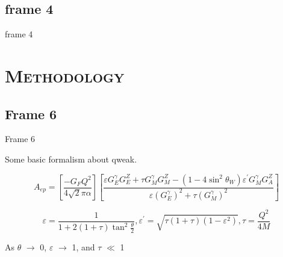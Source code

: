 \documentclass[xcolor=x11names,compress,8pt]{beamer}
\renewcommand{\(}{\begin{columns}}
\renewcommand{\)}{\end{columns}}
\newcommand{\<}[1]{\begin{column}{#1}}
\renewcommand{\>}{\end{column}}
\begin{document}
\subsection{frame 4}
\begin{frame}{frame 4}

\hspace{-0.17em}
\hspace{-0.34em}
\hspace{-0.17em}



\end{frame}



\section{\scshape Methodology}
\subsection{Frame 6}

\begin{frame}{Frame 6}

\fontsize{6pt}{7.2}\selectfont

Some basic formalism about qweak.

\begin{equation} \label{equ:qweak1}
A_{ep} = \left[ \frac{-G_{F}Q^{2}}{4 \sqrt{2}\pi\alpha} \right] \left[ \frac{\varepsilon G_{E}^{\gamma}G_{E}^{Z} + \tau G_{M}^{\gamma}G_{M}^{Z} - (1-4\sin^{2}\theta_{W})\varepsilon^{\prime}G_{M}^{\gamma}G_{A}^{Z} } { \varepsilon(G_{E}^{\gamma})^{2} + \tau(G_{M}^{\gamma})^{2} } \right]
\end{equation}

\begin{equation} \label{equ:qweak2}
\varepsilon = \frac{1}{1 + 2(1+\tau)\tan^{2}\frac{\theta}{2}}, \varepsilon^{\prime} = \sqrt{\tau(1+\tau)(1 - \varepsilon^{2})}, \tau = \frac{Q^{2}}{4M}
\end{equation}

\fontsize{10pt}{7.2}\selectfont

As $\theta$ $\rightarrow$ 0, $\varepsilon$ $\rightarrow$ 1, and $\tau$ $\ll$ 1


\end{frame}
\end{document}
